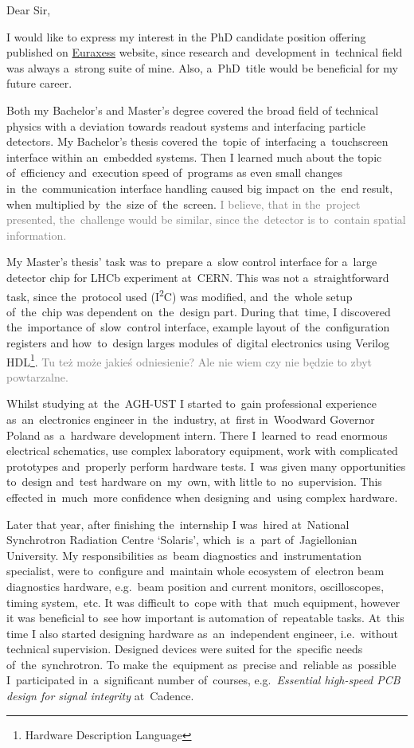 \documentclass[11pt,a4paper,sans]{article}
\newcommand{\iic}{I\textsuperscript{2}C}
\begin{document}
	\noindent
	Dear Sir,
	\vspace{1\baselineskip}
	
	I would like to express my interest in the PhD candidate position offering published on
	\href{https://euraxess.ec.europa.eu/jobs/485237}{Euraxess} website, since research
	and~development in~technical field was always a~strong suite of mine. Also, a~PhD~title
	would be beneficial for my future career.
	
	Both my Bachelor's and Master's degree covered the broad field of technical physics
	with a deviation towards readout systems and interfacing particle detectors. My Bachelor's
	thesis covered the~topic of~interfacing a~touchscreen interface within an~embedded systems.
	Then I learned much about the topic of~efficiency and~execution speed of~programs as even
	small changes in~the~communication interface handling caused big impact on~the~end result,
	when multiplied by~the~size of~the~screen. \textcolor{gray}{I believe, that in the~project presented, 
	the~challenge would be similar, since the~detector is to~contain spatial information.}
	
	My Master's thesis' task was to~prepare a~slow control interface for a~large detector chip
	for LHCb experiment at~CERN. This was not a~straightforward task, since the~protocol used
	(\iic) was modified, and~the~whole setup of~the~chip was dependent on~the~design part.
	During that~time, I discovered the~importance of~slow~control interface, example layout
	of~the~configuration registers and how~to~design larges modules of~digital electronics
	using Verilog HDL\footnote{Hardware Description Language}. \textcolor{gray}{Tu też może
	jakieś odniesienie? Ale nie wiem czy nie będzie to zbyt powtarzalne.}

	Whilst studying at~the~AGH-UST I started to~gain professional experience as~an~electronics
	engineer in~the~industry, at~first in~Woodward Governor Poland as~a~hardware development
	intern. There I~learned to~read enormous electrical schematics, use complex laboratory
	equipment, work with complicated prototypes and~properly perform hardware tests. I~was
	given many opportunities to~design and~test hardware on~my~own, with little to~no~supervision.
	This effected in~much~more confidence when designing and~using complex hardware.
	
	Later that year, after finishing the~internship I was~hired at~National Synchrotron
	Radiation Centre `Solaris', which~is~a~part of~Jagiellonian University. My responsibilities
	as~beam diagnostics and~instrumentation specialist, were to~configure and~maintain whole
	ecosystem of~electron beam diagnostics hardware, e.g.~beam position and current
	monitors, oscilloscopes, timing system,~etc. It was difficult to~cope with~that~much
	equipment, however it was beneficial to~see how important is automation of~repeatable
	tasks. At~this time I also started designing hardware as~an~independent engineer, 
	i.e.~without technical supervision. Designed devices were suited for the~specific needs
	of~the~synchrotron. To make the~equipment as~precise and~reliable as~possible I~participated
	in~a~significant number of~courses, e.g.~\emph{Essential high-speed PCB design for signal 
	integrity} at~Cadence.
\end{document}
